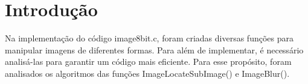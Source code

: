
\section{Introdução}\label{sec:introducao}

\fontsize{12}{12}\selectfont
    \par Na implementação do código image8bit.c, foram criadas diversas funções para manipular imagens
        de diferentes formas. Para além de implementar, é necessário analisá-las para garantir um 
        código mais eficiente. Para esse propósito, foram analisados os algoritmos das funções
        ImageLocateSubImage() e ImageBlur().